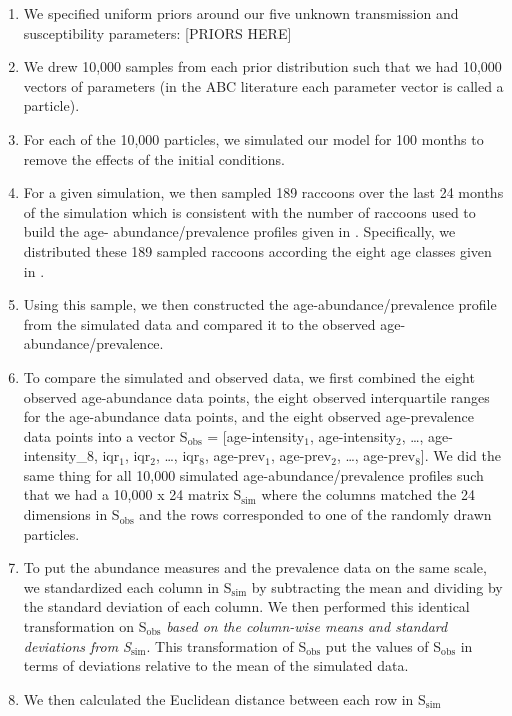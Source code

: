 \documentclass[11pt]{article}
\begin{document}
\begin{enumerate}
\def\labelenumi{\arabic{enumi}.}
\item
  We specified uniform priors around our five unknown transmission and
  susceptibility parameters: {[}PRIORS HERE{]}
\item
  We drew 10,000 samples from each prior distribution such that we had
  10,000 vectors of parameters (in the ABC literature each parameter
  vector is called a particle).
\item
  For each of the 10,000 particles, we simulated our model for 100
  months to remove the effects of the initial conditions.
\item
  For a given simulation, we then sampled 189 raccoons over the last 24
  months of the simulation which is consistent with the number of
  raccoons used to build the age- abundance/prevalence profiles given in \cite{Weinstein2016}. Specifically, we distributed these 189 sampled
  raccoons according the eight age classes given in \cite{Weinstein2016}.
\item
  Using this sample, we then constructed the age-abundance/prevalence
  profile from the simulated data and compared it to the observed age-
  abundance/prevalence.
\item
  To compare the simulated and observed data, we first combined the
  eight observed age-abundance data points, the eight observed interquartile ranges for the age-abundance data points, and the eight observed
  age-prevalence data points into a vector S$_\text{obs}$ = [age-intensity$_1$,
  age-intensity$_2$, \ldots{}, age-intensity\_8, iqr$_1$, iqr$_2$, \ldots{}, iqr$_8$, age-prev$_1$,
  age-prev$_2$, \ldots{}, age-prev$_8$]. We did the same thing for all
  10,000 simulated age-abundance/prevalence profiles such that we had a
  10,000 x 24 matrix S$_\text{sim}$ where the columns matched the 24 dimensions
  in S$_\text{obs}$ and the rows corresponded to one of the randomly drawn
  particles.
\item
  To put the abundance measures and the prevalence data on the same
  scale, we standardized each column in S$_\text{sim}$ by subtracting the mean
  and dividing by the standard deviation of each column. We then
  performed this identical transformation on S$_\text{obs}$ \emph{based on the
  column-wise means and standard deviations from S$_\text{sim}$}. This
  transformation of S$_\text{obs}$ put the values of S$_\text{obs}$ in terms of
  deviations relative to the mean of the simulated data.
\item
  We then calculated the Euclidean distance between each row in S$_\text{sim}$

\end{enumerate}
\end{document}
